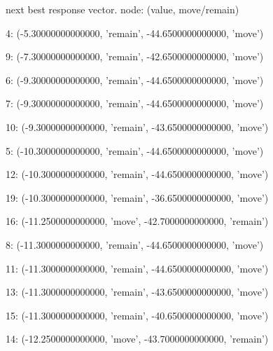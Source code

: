 \begin{figure}[h!]
\end{figure}
\clearpage \pagebreak


 next best response vector.  node: (value, move/remain)


4: (-5.30000000000000, 'remain', -44.6500000000000, 'move')


9: (-7.30000000000000, 'remain', -42.6500000000000, 'move')


6: (-9.30000000000000, 'remain', -44.6500000000000, 'move')


7: (-9.30000000000000, 'remain', -44.6500000000000, 'move')


10: (-9.30000000000000, 'remain', -43.6500000000000, 'move')


5: (-10.3000000000000, 'remain', -44.6500000000000, 'move')


12: (-10.3000000000000, 'remain', -44.6500000000000, 'move')


19: (-10.3000000000000, 'remain', -36.6500000000000, 'move')


16: (-11.2500000000000, 'move', -42.7000000000000, 'remain')


8: (-11.3000000000000, 'remain', -44.6500000000000, 'move')


11: (-11.3000000000000, 'remain', -44.6500000000000, 'move')


13: (-11.3000000000000, 'remain', -43.6500000000000, 'move')


15: (-11.3000000000000, 'remain', -40.6500000000000, 'move')


14: (-12.2500000000000, 'move', -43.7000000000000, 'remain')


